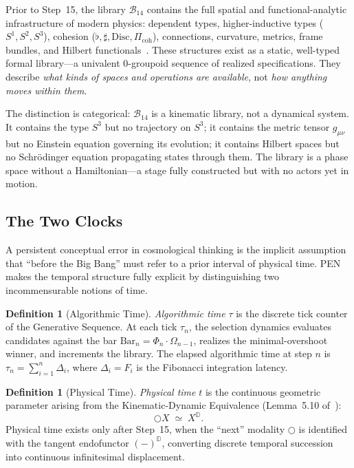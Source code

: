 \documentclass[11pt,a4paper]{article}
\theoremstyle{plain}
\theoremstyle{definition}
\newtheorem{definition}[theorem]{Definition}
\theoremstyle{remark}
\newcommand{\D}{\mathbb{D}}
\newcommand{\B}{\mathcal{B}}
\newcommand{\Disc}{\mathrm{Disc}}
\newcommand{\nextmod}{\bigcirc}
\begin{document}
Prior to Step~15, the library $\B_{14}$ contains the full spatial and functional-analytic infrastructure of modern physics: dependent types, higher-inductive types ($S^1, S^2, S^3$), cohesion ($\flat, \sharp, \Disc, \Pi_{\mathrm{coh}}$), connections, curvature, metrics, frame bundles, and Hilbert functionals~\cite{pen}.
These structures exist as a static, well-typed formal library---a univalent 0-groupoid sequence of realized specifications.
They describe \emph{what kinds of spaces and operations are available}, not \emph{how anything moves within them}.

The distinction is categorical: $\B_{14}$ is a kinematic library, not a dynamical system.
It contains the type $S^3$ but no trajectory on $S^3$; it contains the metric tensor $g_{\mu\nu}$ but no Einstein equation governing its evolution; it contains Hilbert spaces but no Schr\"odinger equation propagating states through them.
The library is a phase space without a Hamiltonian---a stage fully constructed but with no actors yet in motion.

\subsection{The Two Clocks}
\label{sec:two-clocks}

A persistent conceptual error in cosmological thinking is the implicit assumption that ``before the Big Bang'' must refer to a prior interval of physical time.
PEN makes the temporal structure fully explicit by distinguishing two incommensurable notions of time.

\begin{definition}[Algorithmic Time]
\label{def:alg-time}
\emph{Algorithmic time} $\tau$ is the discrete tick counter of the Generative Sequence.
At each tick $\tau_n$, the selection dynamics evaluates candidates against the bar $\mathrm{Bar}_n = \Phi_n \cdot \Omega_{n-1}$, realizes the minimal-overshoot winner, and increments the library.
The elapsed algorithmic time at step $n$ is $\tau_n = \sum_{i=1}^{n} \Delta_i$, where $\Delta_i = F_i$ is the Fibonacci integration latency.
\end{definition}

\begin{definition}[Physical Time]
\label{def:phys-time}
\emph{Physical time} $t$ is the continuous geometric parameter arising from the Kinematic-Dynamic Equivalence (Lemma~5.10 of~\cite{pen}):
\begin{equation}
    \nextmod X \;\simeq\; X^{\D}.
\end{equation}
Physical time exists only after Step~15, when the ``next'' modality $\nextmod$ is identified with the tangent endofunctor $(-)^{\D}$, converting discrete temporal succession into continuous infinitesimal displacement.
\end{definition}
\end{document}
